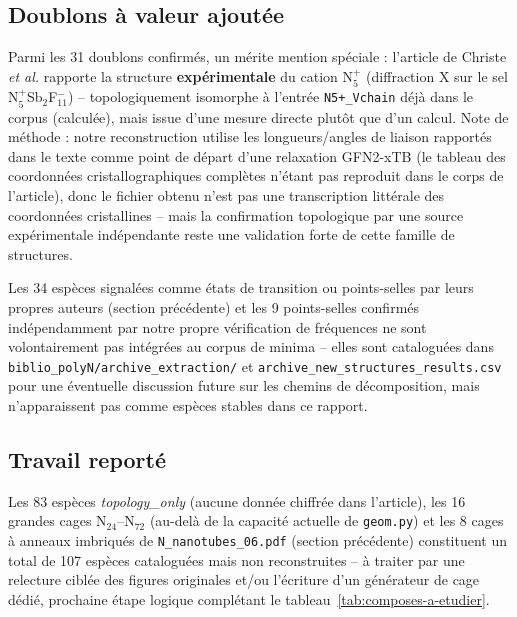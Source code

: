 \documentclass[11pt,a4paper]{article}
\begin{document}
\subsection{Doublons \`a valeur ajout\'ee}

Parmi les 31 doublons confirm\'es, un m\'erite mention sp\'eciale :
l'article de Christe \emph{et al.} rapporte la structure
\textbf{exp\'erimentale} du cation N$_5^{+}$ (diffraction X sur le sel
N$_5^{+}$Sb$_2$F$_{11}^{-}$) -- topologiquement isomorphe \`a l'entr\'ee
\texttt{N5+\_Vchain} d\'ej\`a dans le corpus (calcul\'ee), mais issue d'une
mesure directe plut\^ot que d'un calcul. Note de m\'ethode : notre
reconstruction utilise les longueurs/angles de liaison rapport\'es dans le
texte comme point de d\'epart d'une relaxation GFN2-xTB (le tableau des
coordonn\'ees cristallographiques compl\`etes n'\'etant pas reproduit dans
le corps de l'article), donc le fichier obtenu n'est pas une transcription
litt\'erale des coordonn\'ees cristallines -- mais la confirmation
topologique par une source exp\'erimentale ind\'ependante reste une
validation forte de cette famille de structures.

Les 34 esp\`eces signal\'ees comme \'etats de transition ou points-selles
par leurs propres auteurs (section pr\'ec\'edente) et les 9 points-selles
confirm\'es ind\'ependamment par notre propre v\'erification de
fr\'equences ne sont volontairement pas int\'egr\'ees au corpus de minima
-- elles sont catalogu\'ees dans
\texttt{biblio\_polyN/archive\_extraction/} et
\texttt{archive\_new\_structures\_results.csv} pour une \'eventuelle
discussion future sur les chemins de d\'ecomposition, mais n'apparaissent
pas comme esp\`eces stables dans ce rapport.

\subsection{Travail report\'e}

Les 83 esp\`eces \emph{topology\_only} (aucune donn\'ee chiffr\'ee dans
l'article), les 16 grandes cages N$_{24}$--N$_{72}$ (au-del\`a de la
capacit\'e actuelle de \texttt{geom.py}) et les 8 cages \`a anneaux
imbriqu\'es de \texttt{N\_nanotubes\_06.pdf} (section pr\'ec\'edente)
constituent un total de 107 esp\`eces catalogu\'ees mais non
reconstruites -- \`a traiter par une relecture cibl\'ee des figures
originales et/ou l'\'ecriture d'un g\'en\'erateur de cage d\'edi\'e,
prochaine \'etape logique compl\'etant le tableau~\ref{tab:composes-a-etudier}.
\end{document}
